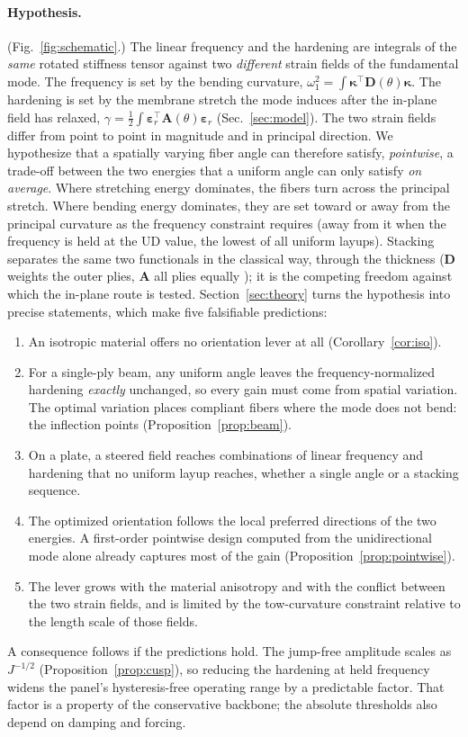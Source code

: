 \paragraph{Hypothesis.} (Fig.~\ref{fig:schematic}.) The linear frequency and the hardening
are integrals of the \emph{same} rotated stiffness tensor against two \emph{different}
strain fields of the fundamental mode. The frequency is set by the bending curvature,
$\omega_1^2=\int\bm\kappa^{\!\top}\bm D(\theta)\bm\kappa$. The hardening is set by the
membrane stretch the mode induces after the in-plane field has relaxed,
$\gamma=\tfrac12\int\bm\varepsilon_r^{\!\top}\bm A(\theta)\bm\varepsilon_r$
(Sec.~\ref{sec:model}). The two strain fields differ from point to point in magnitude
and in principal direction. We hypothesize that a spatially varying fiber angle can
therefore satisfy, \emph{pointwise}, a trade-off between the two energies that a uniform
angle can only satisfy \emph{on average}. Where stretching energy dominates, the fibers turn
across the principal stretch. Where bending energy dominates, they are set toward or away
from the principal curvature as the frequency constraint requires (away from it when the
frequency is held at the UD value, the lowest of all uniform layups). Stacking separates the
same two functionals in the classical way, through the thickness ($\bm D$ weights the outer
plies, $\bm A$ all plies equally \cite{tsai1968}); it is the competing freedom against which
the in-plane route is tested. Section~\ref{sec:theory} turns the hypothesis into precise
statements, which make five falsifiable predictions:
\begin{enumerate}[label=\textbf{P\arabic*},leftmargin=2.2em,itemsep=1pt]
\item An isotropic material offers no orientation lever at all
  (Corollary~\ref{cor:iso}).
\item For a single-ply beam, any uniform angle leaves the frequency-normalized hardening
  \emph{exactly} unchanged, so every gain must come from spatial variation. The
  optimal variation places compliant fibers where the mode does not bend: the inflection
  points (Proposition~\ref{prop:beam}).
\item On a plate, a steered field reaches combinations of linear frequency and hardening
  that no uniform layup reaches, whether a single angle or a stacking sequence.
\item The optimized orientation follows the local preferred directions of the two
  energies. A first-order pointwise design computed from the unidirectional mode alone
  already captures most of the gain (Proposition~\ref{prop:pointwise}).
\item The lever grows with the material anisotropy and with the conflict between the two
  strain fields, and is limited by the tow-curvature constraint relative to the length scale
  of those fields.
\end{enumerate}
\noindent A consequence follows if the predictions hold. The jump-free amplitude scales
as $J^{-1/2}$ (Proposition~\ref{prop:cusp}), so reducing the hardening at held frequency
widens the panel's hysteresis-free operating range by a predictable factor. That factor is a
property of the conservative backbone; the absolute thresholds also depend on damping and
forcing.

